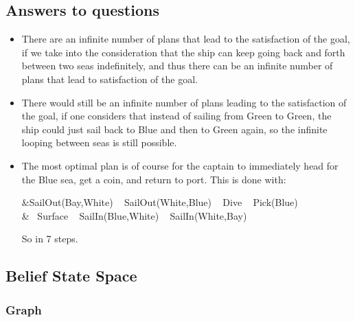 \documentclass[a4paper, 11pt]{article}
\begin{document}
	\subsection{Answers to questions}
	\begin{itemize}
		\item There are an infinite number of plans that lead to the satisfaction of the goal, if we take into the consideration that the ship can keep going back and forth between two seas indefinitely, and thus there can be an infinite number of plans that lead to satisfaction of the goal. 
		\item There would still be an infinite number of plans leading to the satisfaction of the goal, if one considers that instead of sailing from Green to Green, the ship could just sail back to Blue and then to Green again, so the infinite looping between seas is still possible.
		\item The most optimal plan is of course for the captain to immediately head for the Blue sea, get a coin, and return to port. This is done with: \\
		\begin{alignedequations}{2} 
			&SailOut(Bay,White) ~ SailOut(White,Blue) ~ Dive ~ Pick(Blue)\\ &~ Surface ~ SailIn(Blue,White) ~ SailIn(White,Bay)
		\end{alignedequations}
		So in 7 steps.
		
	\end{itemize}

\subsection{Belief State Space}
	

\subsubsection{Graph}
    
\end{document}
